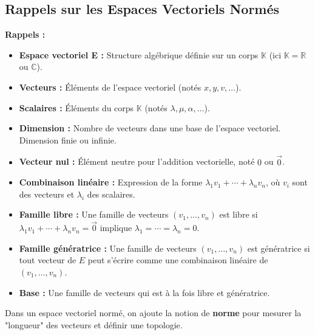 \documentclass{article}
\begin{document}
\subsection{Rappels sur les Espaces Vectoriels Normés}
\textbf{Rappels :}
\begin{itemize}
    \item \textbf{Espace vectoriel E :} Structure algébrique définie sur un corps $\mathbb{K}$ (ici $\mathbb{K} = \mathbb{R}$ ou $\mathbb{C}$).
    \item \textbf{Vecteurs :} Éléments de l'espace vectoriel (notés $x, y, v, \ldots$).
    \item \textbf{Scalaires :} Éléments du corps $\mathbb{K}$ (notés $\lambda, \mu, \alpha, \ldots$).
    \item \textbf{Dimension :} Nombre de vecteurs dans une base de l'espace vectoriel. Dimension finie ou infinie.
    \item \textbf{Vecteur nul :} Élément neutre pour l'addition vectorielle, noté $0$ ou $\vec{0}$.
    \item \textbf{Combinaison linéaire :} Expression de la forme $\lambda_1 v_1 + \cdots + \lambda_n v_n$, où $v_i$ sont des vecteurs et $\lambda_i$ des scalaires.
    \item \textbf{Famille libre :} Une famille de vecteurs $(v_1, \ldots, v_n)$ est libre si $\lambda_1 v_1 + \cdots + \lambda_n v_n = \vec{0}$ implique $\lambda_1 = \cdots = \lambda_n = 0$.
    \item \textbf{Famille génératrice :} Une famille de vecteurs $(v_1, \ldots, v_n)$ est génératrice si tout vecteur de $E$ peut s'écrire comme une combinaison linéaire de $(v_1, \ldots, v_n)$.
    \item \textbf{Base :} Une famille de vecteurs qui est à la fois libre et génératrice.
\end{itemize}
Dans un espace vectoriel normé, on ajoute la notion de \textbf{norme} pour mesurer la "longueur" des vecteurs et définir une topologie.
\end{document}
